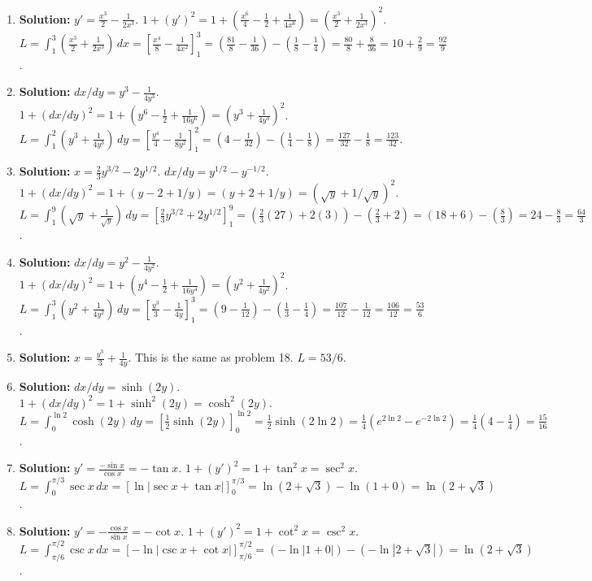 \documentclass[12pt]{article}
\begin{document}
\begin{enumerate}
    \item \textbf{Solution:} $y'=\frac{x^3}{2}-\frac{1}{2x^3}$. $1+(y')^2=1+(\frac{x^6}{4}-\frac{1}{2}+\frac{1}{4x^6})=(\frac{x^3}{2}+\frac{1}{2x^3})^2$.
    $L=\int_1^3 (\frac{x^3}{2}+\frac{1}{2x^3}) \,dx = [\frac{x^4}{8}-\frac{1}{4x^2}]_1^3 = (\frac{81}{8}-\frac{1}{36}) - (\frac{1}{8}-\frac{1}{4}) = \frac{80}{8} + \frac{8}{36} = 10 + \frac{2}{9} = \frac{92}{9}$.

    \item \textbf{Solution:} $dx/dy = y^3 - \frac{1}{4y^3}$. $1+(dx/dy)^2 = 1 + (y^6 - \frac{1}{2} + \frac{1}{16y^6}) = (y^3 + \frac{1}{4y^3})^2$.
    $L=\int_1^2 (y^3 + \frac{1}{4y^3}) \,dy = [\frac{y^4}{4} - \frac{1}{8y^2}]_1^2 = (4-\frac{1}{32}) - (\frac{1}{4}-\frac{1}{8}) = \frac{127}{32} - \frac{1}{8} = \frac{123}{32}$.
    
    \item \textbf{Solution:} $x=\frac{2}{3}y^{3/2} - 2y^{1/2}$. $dx/dy=y^{1/2}-y^{-1/2}$. $1+(dx/dy)^2 = 1+(y-2+1/y)=(y+2+1/y)=(\sqrt{y}+1/\sqrt{y})^2$.
    $L=\int_1^9 (\sqrt{y}+\frac{1}{\sqrt{y}}) \,dy = [\frac{2}{3}y^{3/2}+2y^{1/2}]_1^9 = (\frac{2}{3}(27)+2(3)) - (\frac{2}{3}+2) = (18+6)-(\frac{8}{3}) = 24-\frac{8}{3} = \frac{64}{3}$.
    
    \item \textbf{Solution:} $dx/dy=y^2-\frac{1}{4y^2}$. $1+(dx/dy)^2=1+(y^4-\frac{1}{2}+\frac{1}{16y^4})=(y^2+\frac{1}{4y^2})^2$.
    $L=\int_1^3 (y^2+\frac{1}{4y^2}) \,dy = [\frac{y^3}{3}-\frac{1}{4y}]_1^3 = (9-\frac{1}{12})-(\frac{1}{3}-\frac{1}{4}) = \frac{107}{12}-\frac{1}{12}=\frac{106}{12}=\frac{53}{6}$.
    
    \item \textbf{Solution:} $x=\frac{y^3}{3}+\frac{1}{4y}$. This is the same as problem 18. $L=53/6$.
    
    \item \textbf{Solution:} $dx/dy=\sinh(2y)$. $1+(dx/dy)^2 = 1+\sinh^2(2y)=\cosh^2(2y)$.
    $L=\int_0^{\ln 2} \cosh(2y) \,dy = [\frac{1}{2}\sinh(2y)]_0^{\ln 2} = \frac{1}{2}\sinh(2\ln 2) = \frac{1}{4}(e^{2\ln 2}-e^{-2\ln 2}) = \frac{1}{4}(4-\frac{1}{4}) = \frac{15}{16}$.
    
    \item \textbf{Solution:} $y' = \frac{-\sin x}{\cos x} = -\tan x$. $1+(y')^2=1+\tan^2x=\sec^2x$.
    $L=\int_0^{\pi/3} \sec x \,dx = [\ln|\sec x + \tan x|]_0^{\pi/3} = \ln(2+\sqrt{3}) - \ln(1+0) = \ln(2+\sqrt{3})$.
    
    \item \textbf{Solution:} $y'=-\frac{\cos x}{\sin x}=-\cot x$. $1+(y')^2=1+\cot^2x=\csc^2x$.
    $L=\int_{\pi/6}^{\pi/2} \csc x \,dx = [-\ln|\csc x + \cot x|]_{\pi/6}^{\pi/2} = (-\ln|1+0|) - (-\ln|2+\sqrt{3}|) = \ln(2+\sqrt{3})$.
    

\end{enumerate}
\end{document}
